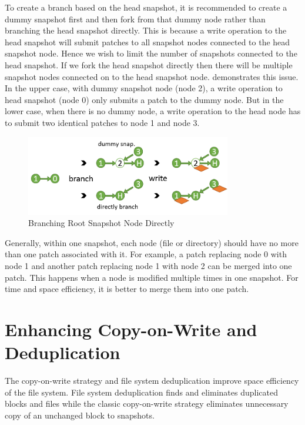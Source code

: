     To create a branch based on the head snapshot, it is recommended to create a dummy snapshot first and then fork from that dummy node rather than branching the head snapshot directly. This is because a write operation to the head snapshot will submit patches to all snapshot nodes connected to the head snapshot node. Hence we wish to limit the number of snapshots connected to the head snapshot. If we fork the head snapshot directly then there will be multiple snapshot nodes connected on to the head snapshot node.  demonstrates this issue. In the upper case, with dummy snapshot node (node 2), a write operation to head snapshot (node 0) only submits a patch to the dummy node. But in the lower case, when there is no dummy node, a write operation to the head node has to submit two identical patches to node 1 and node 3.

\begin{figure}[t]
\centering
\includegraphics[width=0.8\textwidth]{Chapter-4/figs/fig16.png}
\caption{Branching Root Snapshot Node Directly}
\label{fig:dummy_node}
\end{figure}

	Generally, within one snapshot, each node (file or directory) should have no more than one patch associated with it. For example, a patch replacing node 0 with node 1 and another patch replacing node 1 with node 2 can be merged into one patch. This happens when a node is modified multiple times in one snapshot. For time and space efficiency, it is better to merge them into one patch.
	
\section{Enhancing Copy-on-Write and Deduplication}

	The copy-on-write strategy and file system deduplication improve space efficiency of the file system. File system deduplication finds and eliminates duplicated blocks and files while the classic copy-on-write strategy eliminates unnecessary copy of an unchanged block to snapshots.

